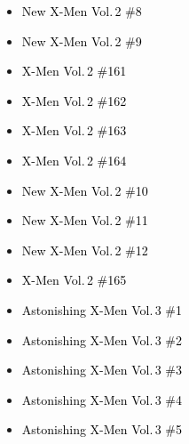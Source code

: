 \documentclass[12pt]{article}
\newcommand{\checkbox}{\raisebox{0.0ex}{\fbox{\rule{0ex}{1.5ex} \rule{1.5ex}{0ex}}}}
\begin{document}
\vspace{0.3cm}
\noindent
\begin{tcolorbox}[
  colback=white!95!gray,
  colframe=black,
  width=\textwidth,
  arc=4mm,
  auto outer arc,
  boxrule=0.8pt,
  left=8pt,right=8pt,top=8pt,bottom=8pt
]
\begin{itemize}[left=0pt,label={\checkbox}]
  \item \textcolor{black}{New X-Men Vol.\,2 \#8}
  \item \textcolor{black}{New X-Men Vol.\,2 \#9}
  \item \textcolor{black}{X-Men Vol.\,2 \#161}
  \item \textcolor{black}{X-Men Vol.\,2 \#162}
  \item \textcolor{black}{X-Men Vol.\,2 \#163}
  \item \textcolor{black}{X-Men Vol.\,2 \#164}
  \item \textcolor{black}{New X-Men Vol.\,2 \#10}
  \item \textcolor{black}{New X-Men Vol.\,2 \#11}
  \item \textcolor{black}{New X-Men Vol.\,2 \#12}
  \item \textcolor{black}{X-Men Vol.\,2 \#165}
  \item \textcolor{black}{Astonishing X-Men Vol.\,3 \#1}
  \item \textcolor{black}{Astonishing X-Men Vol.\,3 \#2}
  \item \textcolor{black}{Astonishing X-Men Vol.\,3 \#3}
  \item \textcolor{black}{Astonishing X-Men Vol.\,3 \#4}
  \item \textcolor{black}{Astonishing X-Men Vol.\,3 \#5}
\end{itemize}
\end{tcolorbox}

\newpage
{}
\end{document}
